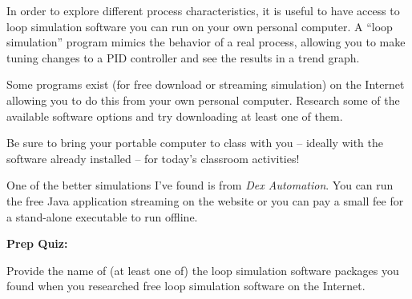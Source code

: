 

In order to explore different process characteristics, it is useful to have access to loop simulation software you can run on your own personal computer.  A ``loop simulation'' program mimics the behavior of a real process, allowing you to make tuning changes to a PID controller and see the results in a trend graph.  

Some programs exist (for free download or streaming simulation) on the Internet allowing you to do this from your own personal computer.  Research some of the available software options and try downloading at least one of them.

\vskip 10pt

Be sure to bring your portable computer to class with you -- ideally with the software already installed -- for today's classroom activities!







One of the better simulations I've found is from {\it Dex Automation}.  You can run the free Java application streaming on the website or you can pay a small fee for a stand-alone executable to run offline.










\vfil \eject

\noindent
{\bf Prep Quiz:}

Provide the name of (at least one of) the loop simulation software packages you found when you researched free loop simulation software on the Internet.



